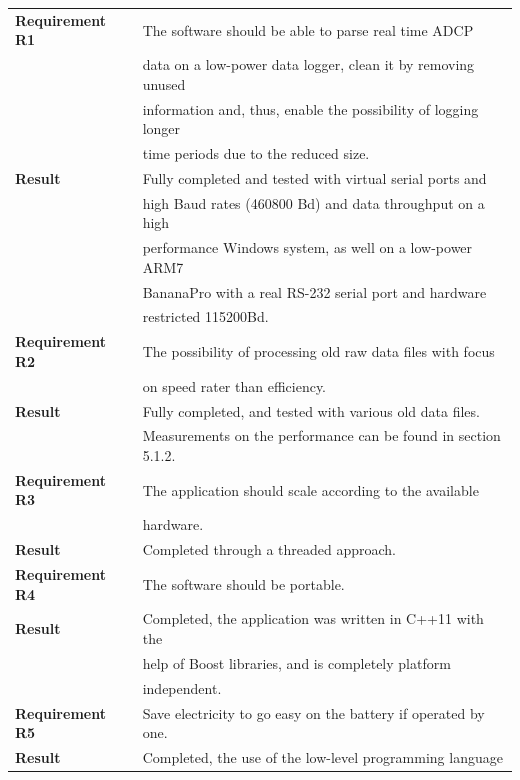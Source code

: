 \begin{table}[!ht]
\centering
	\begin{tabular}{|l|l|}
	  \hline
	  	\textbf{Requirement R1} 
	  	& The software should be able to parse real time ADCP\\ 
	  	& data on a low-power data logger, clean it by removing unused\\
	  	& information and, thus, enable the possibility of logging longer\\
	  	& time periods due to the reduced size.\\ \hline
	  	\textbf{Result} 
	  	& Fully completed and tested with virtual serial ports and\\ 
	  	& high Baud rates (460800 Bd) and data throughput on a high \\ 
	  	& performance Windows system, as well on a low-power ARM7 \\ 
	  	& BananaPro with a real RS-232 serial port and hardware \\ 
	  	& restricted 115200Bd.\\
	  \hline
	  \hline
	  	\textbf{Requirement R2} 
	  	& The possibility of processing old raw data files with focus\\
	  	& on speed rater than efficiency.\\ \hline
	  	\textbf{Result} 
	  	& Fully completed, and tested with various old data files. \\
	  	& Measurements on the performance can be found in section 5.1.2.\\
	  \hline
	  \hline
	  	\textbf{Requirement R3} 
	  	& The application should scale according to the available\\
	  	& hardware.\\ \hline
	  	\textbf{Result} & Completed through a threaded approach.\\
	  \hline
	  \hline
	  	\textbf{Requirement R4} 
	  	& The software should be portable. \\ \hline
	  	\textbf{Result} 
	  	& Completed, the application was written in C++11 with the\\
	  	& help of Boost libraries, and is completely platform\\
	  	& independent.\\
	  \hline
	  \hline
	  	\textbf{Requirement R5} 
	  	& Save electricity to go easy on the battery if operated by one.\\ \hline
	  	\textbf{Result} 
	  	& Completed, the use of the low-level programming language\\

\end{tabular}
\end{table}
